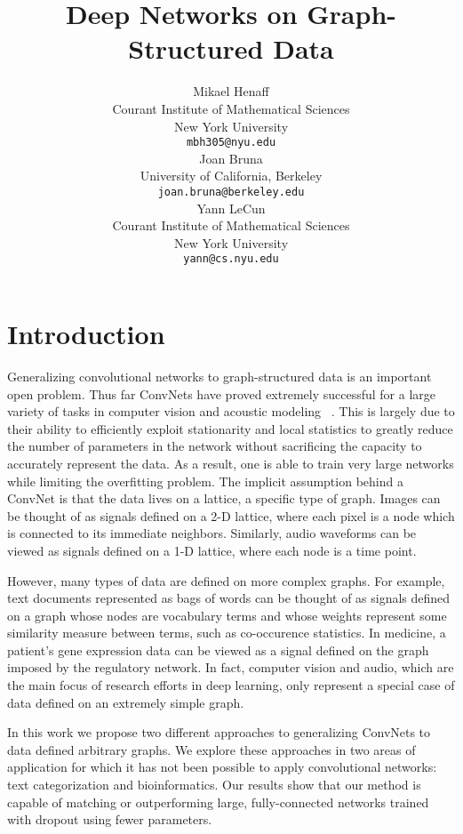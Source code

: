 \documentclass{article} %
\title{Deep Networks on Graph-Structured Data}
\author{
Mikael Henaff \\
Courant Institute of Mathematical Sciences\\
New York University\\
\texttt{mbh305@nyu.edu} \\
\And
Joan Bruna \\
University of California, Berkeley \\
\texttt{joan.bruna@berkeley.edu} \\
\AND
Yann LeCun \\
Courant Institute of Mathematical Sciences \\
New York University \\
\texttt{yann@cs.nyu.edu} \\
}
\begin{document}
\maketitle

\begin{abstract}

\end{abstract}

\section{Introduction}


Generalizing convolutional networks to graph-structured data is an important open problem. 
Thus far ConvNets have proved extremely successful for a large variety of tasks in computer vision and acoustic modeling ~\cite{krizhevsky2012,hinton12}. This is largely due to their ability to efficiently exploit stationarity and local statistics to greatly reduce the number of parameters in the network without sacrificing the capacity to accurately represent the data.  
As a result, one is able to train very large networks while limiting the overfitting problem.
The implicit assumption behind a ConvNet is that the data lives on a lattice, a specific type of graph.
Images can be thought of as signals defined on a 2-D lattice, where each pixel is a node which is connected to its immediate neighbors. 
Similarly, audio waveforms can be viewed as signals defined on a 1-D lattice, where each node is a time point. 

However, many types of data are defined on more complex graphs. For example, text documents represented as bags of words can be thought of as signals defined on a graph whose nodes are vocabulary terms and whose weights represent some similarity measure between terms, such as co-occurence statistics. In medicine, a patient's gene expression data can be viewed as a signal defined on the graph imposed by the regulatory network. In fact, computer vision and audio, which are the main focus of research efforts in deep learning, only represent a special case of data defined on an extremely simple graph. 

In this work we propose two different approaches to generalizing ConvNets to data defined arbitrary graphs. We explore these approaches in two areas of application for which it has not been possible to apply convolutional networks: text categorization and bioinformatics. Our results show that our method is capable of matching or outperforming large, fully-connected networks trained with dropout using fewer parameters. 
\end{document}
